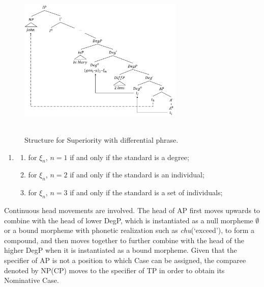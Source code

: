 \documentclass{ctexart}
\begin{document}
\begin{figure}[H]
    \centering
    \includegraphics[width=0.7\textwidth]{pic/superiority_structure_diff.png}
    \begin{caption}
        \\ \vspace{-1.1ex}
        Structure for Superiority with differential phrase.
    \end{caption}
\end{figure}

\begin{enumerate}
    \item \label{superiority_example_10}
    \begin{enumerate}
        \item \label{superiority_example_10_a}
        for $\xi_n$, $n=1$ if and only if the standard is a degree;

        \item \label{superiority_example_10_b}
        for $\xi_n$, $n=2$ if and only if the standard is an individual;

        \item \label{superiority_example_10_c}
        for $\xi_n$, $n=3$ if and only if the standard is a set of individuals;

    \end{enumerate}
\end{enumerate}

Continuous head movements are involved. The head of AP first moves upwards to combine with the head of lower DegP, which is instantiated as a null morpheme $\emptyset$ or a bound morpheme with phonetic realization such as \textit{chu}(`exceed'), to form a compound, and then moves together to further combine with the head of the higher DegP when it is instantiated as a bound morpheme. Given that the specifier of AP is not a position to which Case can be assigned, the comparee denoted by NP(CP) moves to the specifier of TP in order to obtain its Nominative Case.
\end{document}

